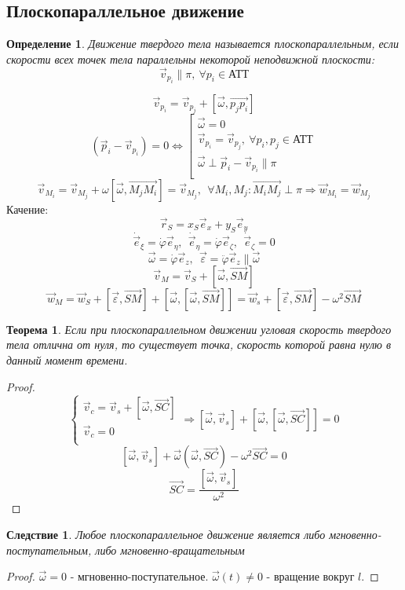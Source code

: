\documentclass{article}
\renewcommand{\v}[1]{{\vec{#1}}}
\newtheorem*{df}{Определение}
\newtheorem{teo}{Теорема}
\newtheorem*{cor}{Следствие}
\begin{document}
  \subsection{Плоскопараллельное движение}
  \begin{df}
  Движение твердого тела называется плоскопараллельным, если скорости всех точек тела параллельны некоторой неподвижной плоскости:
  $$ \v{v}_{p_i} \parallel \pi,~ \forall p_i \in \text{АТТ} $$
  \end{df}

  $$ \v{v}_{p_i} = \v{v}_{p_j} + [\v{\omega}, \v{p_j p_i}] $$
  $$ 
  (\v{p}_i - \v{v}_{p_i}) = 0 \Leftrightarrow 
  \left[
  \begin{array}{l}
  \v{\omega} = 0 \\
  \v{v}_{p_i} = \v{v}_{p_j},~ \forall p_i, p_j \in \text{АТТ} \\
  \v{\omega} \perp \v{p}_i - \v{v}_{p_i} \parallel \pi \\
  \end{array}
  \right.
  $$
  $$ \vec{v}_{M_i} = \vec{v}_{M_j} + \omega [\vec{\omega}, \overrightarrow{M_jM_i}] = \vec{v}_{M_j},~~ \forall M_i, M_j: \overrightarrow{M_iM_j} \perp \pi \Rightarrow \vec{w}_{M_i} = \vec{w}_{M_j} $$
  Качение:
  $$ \vec{r}_S = x_S \vec{e}_x + y_S \vec{e}_y $$
  $$ \dot{\vec{e}}_{\xi} = \dot{\varphi}\vec{e}_{\eta},~~ \dot{\vec{e}}_{\eta} = \dot{\varphi}\vec{e}_{\zeta},~~ \dot{\vec{e}}_{\zeta} = 0$$
  $$ \vec{\omega} = \dot{\varphi} \vec{e}_z,~~ \vec{\varepsilon} = \ddot{\varphi} \vec{e}_z \parallel \vec{\omega}$$
  $$ \vec{v}_M = \vec{v}_S + [\vec{\omega}, \overrightarrow{SM}] $$
  $$ \vec{w}_M = \vec{w}_S + [\vec{\varepsilon}, \overrightarrow{SM}] + [\vec{\omega}, [\vec{\omega}, \overrightarrow{SM}]] = \vec{w}_s + [\vec{\varepsilon}, \overrightarrow{SM}] - \omega^2 \overrightarrow{SM} $$ 

  \begin{teo}
  Если при плоскопараллельном движении угловая скорость твердого тела отлична от нуля, то существует точка, скорость которой равна нулю в данный момент времени.
  \end{teo}
  \begin{proof}
  $$
  \begin{cases}
  \v{v}_c = \v{v}_s + [\v{\omega}, \v{SC}] \\
  \v{v}_c = 0 \\
  \end{cases}
  \Rightarrow
  [\v{\omega}, \v{v}_s] + [\v{\omega}, [\v{\omega}, \v{SC}]] = 0 $$
  $$ [\v{\omega}, \v{v}_s] + \v{\omega}(\v{\omega}, \v{SC}) - \omega^2 \v{SC} = 0 $$
  $$ \v{SC} = \frac{[\v{\omega}, \v{v}_s]}{\omega^2} $$
  \end{proof}
  \begin{cor} 
  Любое плоскопараллельное движение является либо мгновенно-поступательным, либо мгновенно-вращательным
  \end{cor}
  \begin{proof}
  $\v{\omega} = 0$ - мгновенно-поступательное. $\v{\omega}(t) \neq 0$ - вращение вокруг $l$. 
  
  \end{proof}
\end{document}
